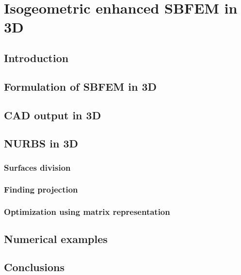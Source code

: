 
\chapter{Isogeometric enhanced SBFEM in 3D}

\section{Introduction}

\section{Formulation of SBFEM in 3D}

\section{CAD output in 3D}

\section{NURBS in 3D}

    \subsection{Surfaces division}

    \subsection{Finding projection}

    \subsection{Optimization using matrix representation}

\section{Numerical examples}

\section{Conclusions}